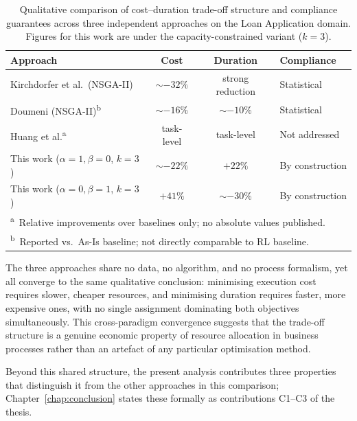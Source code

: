 \begin{table}[H]
\centering
\caption{Qualitative comparison of cost--duration trade-off
structure and compliance guarantees across three independent
approaches on the Loan Application domain. Figures for this work are
under the capacity-constrained variant ($k=3$).}
\label{tab:cross_paradigm}

{\renewcommand{\arraystretch}{1.5}
\begin{tabularx}{\linewidth}{X c c p{3.2cm}}
\toprule
\textbf{Approach} & \textbf{Cost} &
\textbf{Duration} & \textbf{Compliance} \\
\midrule
Kirchdorfer et al.\ (NSGA-II)
    & $\sim -32\%$ & strong reduction
    & Statistical \\
Doumeni (NSGA-II)\textsuperscript{b}
    & $\sim -16\%$ & $\sim -10\%$
    & Statistical \\
Huang et al.\textsuperscript{a}
    & task-level & task-level
    & Not addressed \\
This work ($\alpha=1, \beta=0$, $k=3$)
    & $\sim -22\%$ & $+22\%$
    & By construction \\
This work ($\alpha=0, \beta=1$, $k=3$)
    & $+41\%$ & $\sim -30\%$
    & By construction \\
\bottomrule
\multicolumn{4}{l}{%
  \footnotesize\textsuperscript{a}~Relative improvements over
  baselines only; no absolute values published.}\\
\multicolumn{4}{l}{%
  \footnotesize\textsuperscript{b}~Reported vs.\ As-Is baseline; not directly comparable to RL baseline.}
\end{tabularx}}

\vspace{2mm}

\end{table}

The three approaches share no data, no algorithm, and no process formalism, yet all converge to the same qualitative conclusion: minimising execution cost requires slower, cheaper resources, and minimising duration requires faster, more expensive ones, with no single assignment dominating both objectives simultaneously. This cross-paradigm convergence suggests that the trade-off structure is a genuine economic property of resource allocation in business processes rather than an artefact of any particular optimisation method.

Beyond this shared structure, the present analysis contributes three properties that distinguish it from the other approaches in this comparison; Chapter~\ref{chap:conclusion} states these formally as contributions C1--C3 of the thesis.

